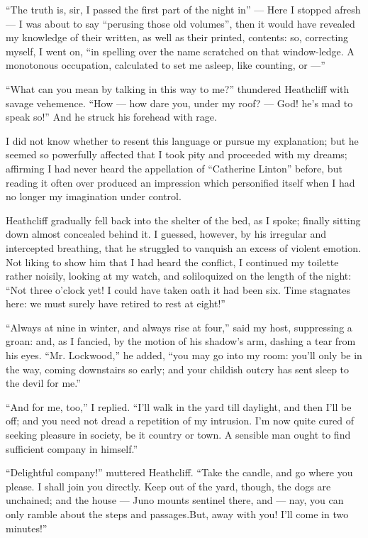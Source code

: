 \par “The truth is, sir, I passed the first part of the night in” — Here I stopped afresh — I was about to say “perusing those old volumes”, then it would have revealed my knowledge of their written, as well as their printed, contents: so, correcting myself, I went on, “in spelling over the name scratched on that window-ledge. A monotonous occupation, calculated to set me asleep, like counting, or —”
\par “What can you mean by talking in this way to me?” thundered Heathcliff with savage vehemence. “How — how dare you, under my roof? — God! he's mad to speak so!” And he struck his forehead with rage.
\par I did not know whether to resent this language or pursue my explanation; but he seemed so powerfully affected that I took pity and proceeded with my dreams; affirming I had never heard the appellation of “Catherine Linton” before, but reading it often over produced an impression which personified itself when I had no longer my imagination under control.
\par Heathcliff gradually fell back into the shelter of the bed, as I spoke; finally sitting down almost concealed behind it. I guessed, however, by his irregular and intercepted breathing, that he struggled to vanquish an excess of violent emotion. Not liking to show him that I had heard the conflict, I continued my toilette rather noisily, looking at my watch, and soliloquized on the length of the night: “Not three o'clock yet! I could have taken oath it had been six. Time stagnates here: we must surely have retired to rest at eight!”
\par “Always at nine in winter, and always rise at four,” said my host, suppressing a groan: and, as I fancied, by the motion of his shadow's arm, dashing a tear from his eyes. “Mr. Lockwood,” he added, “you may go into my room: you'll only be in the way, coming downstairs so early; and your childish outcry has sent sleep to the devil for me.”
\par “And for me, too,” I replied. “I'll walk in the yard till daylight, and then I'll be off; and you need not dread a repetition of my intrusion. I'm now quite cured of seeking pleasure in society, be it country or town. A sensible man ought to find sufficient company in himself.”
\par “Delightful company!” muttered Heathcliff. “Take the candle, and go where you please. I shall join you directly. Keep out of the yard, though, the dogs are unchained; and the house — Juno mounts sentinel there, and — nay, you can only ramble about the steps and passages.But, away with you! I'll come in two minutes!”
